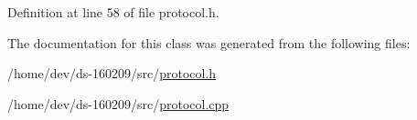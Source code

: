 Definition at line 58 of file protocol.\+h.



The documentation for this class was generated from the following files\+:\begin{DoxyCompactItemize}
\item 
/home/dev/ds-\/160209/src/\hyperlink{protocol_8h}{protocol.\+h}\item 
/home/dev/ds-\/160209/src/\hyperlink{protocol_8cpp}{protocol.\+cpp}\end{DoxyCompactItemize}
